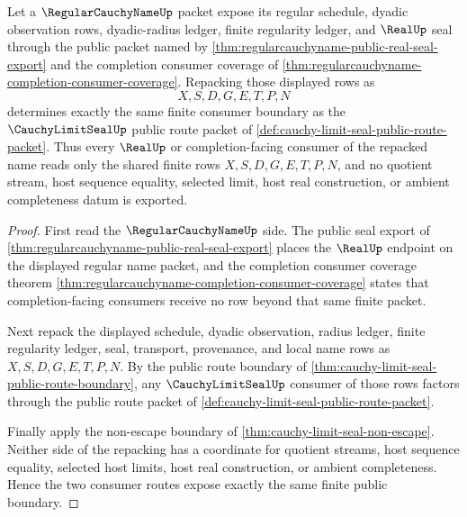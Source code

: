 \begin{theorem}
\label{thm:cauchy-limit-seal-regular-name-consumer-link}
Let a $\RegularCauchyNameUp$ packet expose its regular schedule, dyadic
observation rows, dyadic-radius ledger, finite regularity ledger, and
$\RealUp$ seal through the public packet named by
\autoref{thm:regularcauchyname-public-real-seal-export} and the completion
consumer coverage of \autoref{thm:regularcauchyname-completion-consumer-coverage}.
Repacking those displayed rows as
$$
X,S,D,G,E,T,P,N
$$
determines exactly the same finite consumer boundary as the
$\CauchyLimitSealUp$ public route packet of
\autoref{def:cauchy-limit-seal-public-route-packet}. Thus every $\RealUp$ or
completion-facing consumer of the repacked name reads only the shared finite
rows $X,S,D,G,E,T,P,N$, and no quotient stream, host sequence equality,
selected limit, host real construction, or ambient completeness datum is
exported.
\end{theorem}
\begin{proof}
First read the $\RegularCauchyNameUp$ side. The public seal export of
\autoref{thm:regularcauchyname-public-real-seal-export} places the $\RealUp$
endpoint on the displayed regular name packet, and the completion consumer
coverage theorem \autoref{thm:regularcauchyname-completion-consumer-coverage}
states that completion-facing consumers receive no row beyond that same finite
packet.

Next repack the displayed schedule, dyadic observation, radius ledger, finite
regularity ledger, seal, transport, provenance, and local name rows as
$X,S,D,G,E,T,P,N$. By the public route boundary of
\autoref{thm:cauchy-limit-seal-public-route-boundary}, any
$\CauchyLimitSealUp$ consumer of those rows factors through the public route
packet of \autoref{def:cauchy-limit-seal-public-route-packet}.

Finally apply the non-escape boundary of
\autoref{thm:cauchy-limit-seal-non-escape}. Neither side of the repacking has a
coordinate for quotient streams, host sequence equality, selected host limits,
host real construction, or ambient completeness. Hence the two consumer routes
expose exactly the same finite public boundary.
\end{proof}


